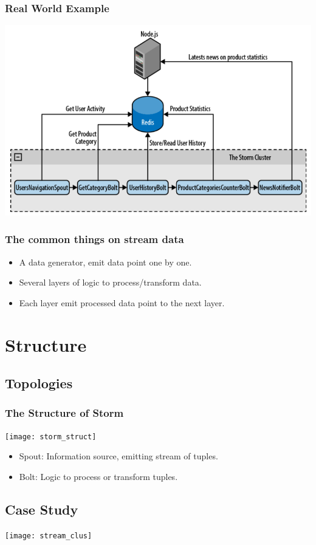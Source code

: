 \documentclass{beamer}
\begin{document}
\begin{frame}
    \frametitle{Real World Example}
    \includegraphics[width=\textwidth]{real}
\end{frame}

\begin{frame}
    \frametitle{The common things on stream data}
    \begin{itemize}
        \item A data generator, emit data point one by one.
        \item Several layers of logic to process/transform data.
        \item Each layer emit processed data point to the next layer.
    \end{itemize}
\end{frame}
\section{Structure}
\subsection{Topologies}
\begin{frame}
    \frametitle{The Structure of Storm}
    \texttt{[image: storm\_struct]}
\end{frame}
\begin{frame}
    \begin{itemize}
        \item Spout: Information source, emitting stream of tuples.
        \item Bolt: Logic to process or transform tuples.
    \end{itemize}
\end{frame}
\subsection{Case Study}
\begin{frame}
    \texttt{[image: stream\_clus]}
\end{frame}
\end{document}
